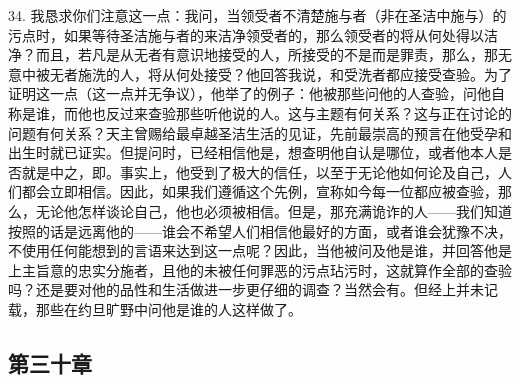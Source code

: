 34. 我恳求你们注意这一点：我问，当领受者不清楚施与者（非在圣洁中施与）的污点时，如果等待圣洁施与者的来洁净领受者的，那么领受者的将从何处得以洁净？而且，若凡是从无者有意识地接受的人，所接受的不是而是罪责，那么，那无意中被无者施洗的人，将从何处接受？他回答我说，和受洗者都应接受查验。为了证明这一点（这一点并无争议），他举了的例子：他被那些问他的人查验，问他自称是谁，而他也反过来查验那些听他说的人。这与主题有何关系？这与正在讨论的问题有何关系？天主曾赐给最卓越圣洁生活的见证，先前最崇高的预言在他受孕和出生时就已证实。但提问时，已经相信他是，想查明他自认是哪位，或者他本人是否就是中之，即。事实上，他受到了极大的信任，以至于无论他如何论及自己，人们都会立即相信。因此，如果我们遵循这个先例，宣称如今每一位都应被查验，那么，无论他怎样谈论自己，他也必须被相信。但是，那充满诡诈的人——我们知道按照的话是远离他的——谁会不希望人们相信他最好的方面，或者谁会犹豫不决，不使用任何能想到的言语来达到这一点呢？因此，当他被问及他是谁，并回答他是上主旨意的忠实分施者，且他的未被任何罪恶的污点玷污时，这就算作全部的查验吗？还是要对他的品性和生活做进一步更仔细的调查？当然会有。但经上并未记载，那些在约旦旷野中问他是谁的人这样做了。\par


\subsection{第三十章}

